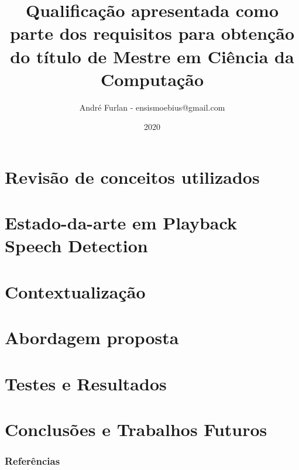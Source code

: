 \documentclass[
	aspectratio=169
]{beamer}
\title{Qualificação apresentada como parte dos requisitos para obtenção do título de Mestre em Ciência da Computação}
\institute{Universidade Estadual Paulista Júlio de Mesquita Filho}
\author{André Furlan - ensismoebius@gmail.com}
\date{2020}
\begin{document}
	
	\frame{\titlepage}
		

	\section{Revisão de conceitos utilizados}
		
		
		
		
		
		
		
	
	\section{Estado-da-arte em Playback Speech Detection}
		
		
	\section{Contextualização}
		

	\section{Abordagem proposta}
		
		
		
		
	\section{Testes e Resultados}
		
		
		
			
		
	\section{Conclusões e Trabalhos Futuros}
		
	
	\begin{frame}[allowframebreaks]
		\frametitle{Referências}
		
		
	\end{frame}
	
\end{document}
